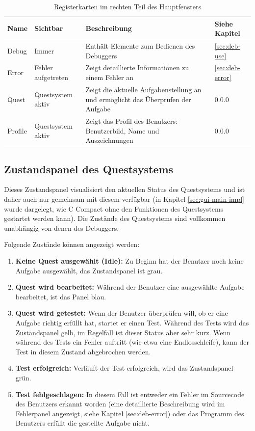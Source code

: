 \def\arraystretch{1.6}
\begin{table}[h!]
\begin{tabular}{|l|p{2.5cm}|p{6.6cm}|l|}
\hline
\textbf{Name}&\textbf{Sichtbar}&\textbf{Beschreibung}&\textbf{Siehe Kapitel}\\
\hline
Debug&Immer&Enthält Elemente zum Bedienen des Debuggers&\ref{sec:deb-use}\\
Error&Fehler aufgetreten&Zeigt detaillierte Informationen zu einem Fehler an&\ref{sec:deb-error}\\
Quest&Questsystem aktiv&Zeigt die aktuelle Aufgabenstellung an und ermöglicht das Überprüfen der Aufgabe&0.0.0\\ %
Profile&Questsystem aktiv&Zeigt das Profil des Benutzers: Benutzerbild, Name und Auszeichnungen&0.0.0\\ %
\hline
\end{tabular}
\caption{Registerkarten im rechten Teil des Hauptfensters}\label{tab:gui-main-right-reg}
\end{table}

\subsection{Zustandspanel des Questsystems}
Dieses Zustandspanel visualisiert den aktuellen Status des Questsystems und ist daher auch nur gemeinsam mit diesem verfügbar (in Kapitel \ref{sec:gui-main-impl} wurde dargelegt, wie C Compact ohne den Funktionen des Questsystems gestartet werden kann). Die Zustände des Questsystems sind vollkommen unabhängig von denen des Debuggers.

Folgende Zustände können angezeigt werden:
\begin{enumerate}
\item \textbf{Keine Quest ausgewählt (Idle):} Zu Beginn hat der Benutzer noch keine Aufgabe ausgewählt, das Zustandspanel ist grau.
\item \textbf{Quest wird bearbeitet:} Während der Benutzer eine ausgewählte Aufgabe bearbeitet, ist das Panel blau.
\item \textbf{Quest wird getestet:} Wenn der Benutzer überprüfen will, ob er eine Aufgabe richtig erfüllt hat, startet er einen Test. Während des Tests wird das Zustandspanel gelb, im Regelfall ist dieser Status aber sehr kurz. Wenn während des Tests ein Fehler auftritt (wie etwa eine Endlosschleife), kann der Test in diesem Zustand abgebrochen werden.
\item \textbf{Test erfolgreich:} Verläuft der Test erfolgreich, wird das Zustandspanel grün.
\item \textbf{Test fehlgeschlagen:} In diesem Fall ist entweder ein Fehler im Sourcecode des Benutzers erkannt worden (eine detaillierte Beschreibung wird im Fehlerpanel angezeigt, siehe Kapitel \ref{sec:deb-error}) oder das Programm des Benutzers erfüllt die gestellte Aufgabe nicht.
\end{enumerate}

